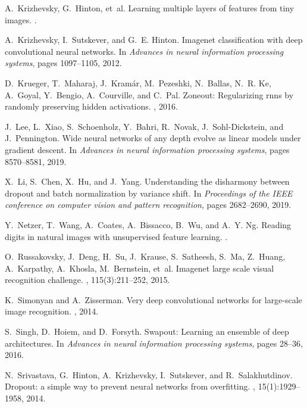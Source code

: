 \documentclass[11pt]{article}
\begin{document}
\begin{thebibliography}{10}
A.~Krizhevsky, G.~Hinton, et~al.
\newblock Learning multiple layers of features from tiny images.
.

A.~Krizhevsky, I.~Sutskever, and G.~E. Hinton.
\newblock Imagenet classification with deep convolutional neural networks.
\newblock In {\em Advances in neural information processing systems}, pages
  1097--1105, 2012.

D.~Krueger, T.~Maharaj, J.~Kram{\'a}r, M.~Pezeshki, N.~Ballas, N.~R. Ke,
  A.~Goyal, Y.~Bengio, A.~Courville, and C.~Pal.
\newblock Zoneout: Regularizing rnns by randomly preserving hidden activations.
, 2016.

J.~Lee, L.~Xiao, S.~Schoenholz, Y.~Bahri, R.~Novak, J.~Sohl-Dickstein, and
  J.~Pennington.
\newblock Wide neural networks of any depth evolve as linear models under
  gradient descent.
\newblock In {\em Advances in neural information processing systems}, pages
  8570--8581, 2019.

X.~Li, S.~Chen, X.~Hu, and J.~Yang.
\newblock Understanding the disharmony between dropout and batch normalization
  by variance shift.
\newblock In {\em Proceedings of the IEEE conference on computer vision and
  pattern recognition}, pages 2682--2690, 2019.

Y.~Netzer, T.~Wang, A.~Coates, A.~Bissacco, B.~Wu, and A.~Y. Ng.
\newblock Reading digits in natural images with unsupervised feature learning.
.

O.~Russakovsky, J.~Deng, H.~Su, J.~Krause, S.~Satheesh, S.~Ma, Z.~Huang,
  A.~Karpathy, A.~Khosla, M.~Bernstein, et~al.
\newblock Imagenet large scale visual recognition challenge.
, 115(3):211--252,
  2015.

K.~Simonyan and A.~Zisserman.
\newblock Very deep convolutional networks for large-scale image recognition.
, 2014.

S.~Singh, D.~Hoiem, and D.~Forsyth.
\newblock Swapout: Learning an ensemble of deep architectures.
\newblock In {\em Advances in neural information processing systems}, pages
  28--36, 2016.

N.~Srivastava, G.~Hinton, A.~Krizhevsky, I.~Sutskever, and R.~Salakhutdinov.
\newblock Dropout: a simple way to prevent neural networks from overfitting.
, 15(1):1929--1958,
  2014.


\end{thebibliography}
\end{document}
